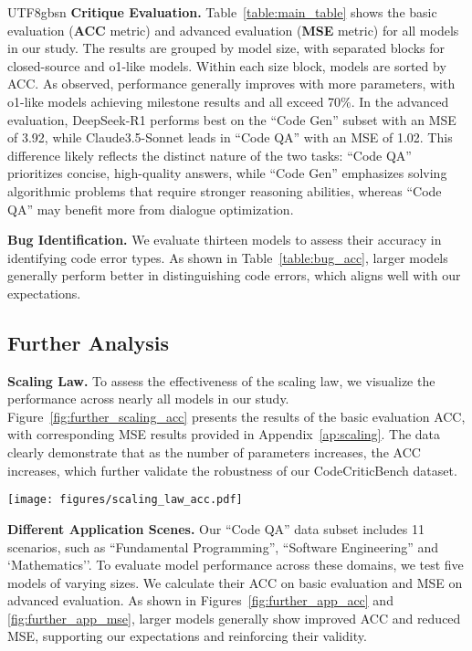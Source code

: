 \documentclass[11pt, a4paper, logo, copyright, nonumbering, amsart]{map}
\begin{document}
\begin{CJK*}{UTF8}{gbsn}
\textbf{Critique Evaluation.} Table~\ref{table:main_table} shows the basic evaluation (\textbf{ACC} metric) and advanced evaluation (\textbf{MSE} metric) for all models in our study. The results are grouped by model size, with separated blocks for closed-source and o1-like models. Within each size block, models are sorted by ACC. As observed, performance generally improves with more parameters, with o1-like models achieving milestone results and all exceed 70\%. In the advanced evaluation, DeepSeek-R1 performs best on the ``Code Gen'' subset with an MSE of 3.92, while Claude3.5-Sonnet leads in ``Code QA'' with an MSE of 1.02. This difference likely reflects the distinct nature of the two tasks: ``Code QA'' prioritizes concise, high-quality answers, while ``Code Gen'' emphasizes solving algorithmic problems that require stronger reasoning abilities, whereas ``Code QA'' may benefit more from dialogue optimization.

\noindent \textbf{Bug Identification.} We evaluate thirteen models to assess their accuracy in identifying code error types. As shown in Table~\ref{table:bug_acc}, larger models generally perform better in distinguishing code errors, which aligns well with our expectations.

\subsection{Further Analysis}

\textbf{Scaling Law.} To assess the effectiveness of the scaling law, we visualize the performance across nearly all models in our study. Figure~\ref{fig:further_scaling_acc} presents the results of the basic evaluation ACC, with corresponding MSE results provided in Appendix~\ref{ap:scaling}. The data clearly demonstrate that as the number of parameters increases, the ACC increases, which further validate the robustness of our CodeCriticBench dataset.

\begin{figure*}[h]
    \centering
    \texttt{[image: figures/scaling\_law\_acc.pdf]}
    \caption{Scaling law on basic critique evaluation (ACC) across models. ``*'' indicates an estimated parameter size.} \label{fig:further_scaling_acc}
\end{figure*}

\noindent \textbf{Different Application Scenes.} Our ``Code QA'' data subset includes 11 scenarios, such as ``Fundamental Programming'', ``Software Engineering'' and `Mathematics''. To evaluate model performance across these domains, we test five models of varying sizes. We calculate their ACC on basic evaluation and MSE on advanced evaluation. As shown in Figures~\ref{fig:further_app_acc} and \ref{fig:further_app_mse}, larger models generally show improved ACC and reduced MSE, supporting our expectations and reinforcing their validity.


\end{CJK*}
\end{document}
